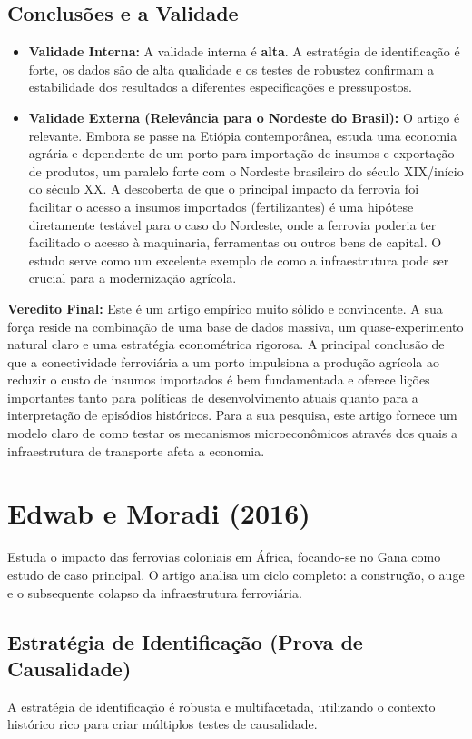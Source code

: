 \documentclass[12pt, a4paper]{article}
\begin{document}
\subsection{Conclusões e a Validade}
\begin{itemize}
    \item \textbf{Validade Interna:} A validade interna é \textbf{alta}. A estratégia de identificação é forte, os dados são de alta qualidade e os testes de robustez confirmam a estabilidade dos resultados a diferentes especificações e pressupostos.
    \item \textbf{Validade Externa (Relevância para o Nordeste do Brasil):} O artigo é relevante. Embora se passe na Etiópia contemporânea, estuda uma economia agrária e dependente de um porto para importação de insumos e exportação de produtos, um paralelo forte com o Nordeste brasileiro do século XIX/início do século XX. A descoberta de que o principal impacto da ferrovia foi facilitar o acesso a insumos importados (fertilizantes) é uma hipótese diretamente testável para o caso do Nordeste, onde a ferrovia poderia ter facilitado o acesso à maquinaria, ferramentas ou outros bens de capital. O estudo serve como um excelente exemplo de como a infraestrutura pode ser crucial para a modernização agrícola.
\end{itemize}

\noindent\textbf{Veredito Final:} Este é um artigo empírico muito sólido e convincente. A sua força reside na combinação de uma base de dados massiva, um quase-experimento natural claro e uma estratégia econométrica rigorosa. A principal conclusão de que a conectividade ferroviária a um porto impulsiona a produção agrícola ao reduzir o custo de insumos importados é bem fundamentada e oferece lições importantes tanto para políticas de desenvolvimento atuais quanto para a interpretação de episódios históricos. Para a sua pesquisa, este artigo fornece um modelo claro de como testar os mecanismos microeconômicos através dos quais a infraestrutura de transporte afeta a economia.

\section{Edwab e Moradi (2016)}
Estuda o impacto das ferrovias coloniais em África, focando-se no Gana como estudo de caso principal. O artigo analisa um ciclo completo: a construção, o auge e o subsequente colapso da infraestrutura ferroviária.

\subsection{Estratégia de Identificação (Prova de Causalidade)}
A estratégia de identificação é robusta e multifacetada, utilizando o contexto histórico rico para criar múltiplos testes de causalidade.
\end{document}
